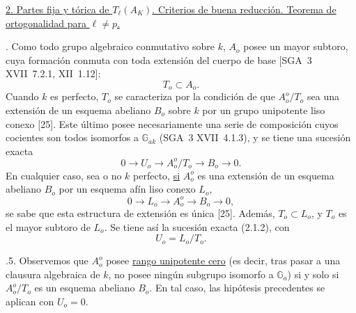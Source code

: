\par\medskip
\noindent
\underline{2. Partes fija y tórica de $T_\ell(A_K)$. Criterios de buena
reducción. Teorema de ortogonalidad para $\ell\ne p$.}

\medskip
{}. Como todo grupo algebraico conmutativo sobre $k$, $A_o$ posee un
mayor subtoro, cuya formación conmuta con toda extensión del cuerpo de
base [SGA~3 XVII~7.2.1, XII~1.12]:
\begin{equation}\tag{2.1.1}
 T_o\subset A_o.
\end{equation}
Cuando $k$ es perfecto, $T_o$ se caracteriza por la condición de que
$A_o^o/T_o$ sea una extensión de un esquema abeliano $B_o$ sobre $k$
por un grupo unipotente liso conexo [25]. Este último posee
necesariamente una serie de composición cuyos cocientes son todos
isomorfos a $\mathbb G_{ak}$ (SGA~3 XVII~4.1.3), y se tiene una
sucesión exacta
\begin{equation}\tag{2.1.2}
 0\longrightarrow U_o\longrightarrow A_o^o/T_o
 \longrightarrow B_o\longrightarrow0.
\end{equation}
En cualquier caso, sea o no $k$ perfecto, \underline{si} $A_o^o$ es
una extensión de un esquema abeliano $B_o$ por un esquema afín liso
conexo $L_o$,
\begin{equation}\tag{2.1.3}
 0\longrightarrow L_o\longrightarrow A_o^o
 \longrightarrow B_o\longrightarrow0,
\end{equation}
se sabe que esta estructura de extensión es única [25]. Además,
$T_o\subset L_o$, y $T_o$ es el mayor subtoro de $L_o$. Se tiene así
la sucesión exacta (2.1.2), con
\begin{equation}\tag{2.1.4}
 U_o=L_o/T_o.
\end{equation}

\medskip
{}.5. Observemos que $A_o^o$ posee \underline{rango unipotente cero}
(es decir, tras pasar a una clausura algebraica de $k$, no posee ningún
subgrupo isomorfo a $\mathbb G_a$) si y solo si $A_o^o/T_o$ es un
esquema abeliano $B_o$. En tal caso, las hipótesis precedentes se
aplican con $U_o=0$.

